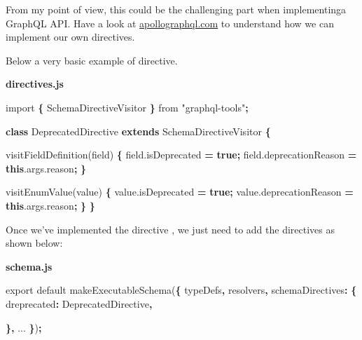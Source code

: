 \documentclass[]{book}
\newenvironment{Shaded}{\begin{snugshade}}{\end{snugshade}}
\newcommand{\KeywordTok}[1]{\textcolor[rgb]{0.13,0.29,0.53}{\textbf{#1}}}
\newcommand{\DataTypeTok}[1]{\textcolor[rgb]{0.13,0.29,0.53}{#1}}
\newcommand{\StringTok}[1]{\textcolor[rgb]{0.31,0.60,0.02}{#1}}
\newcommand{\ImportTok}[1]{#1}
\newcommand{\VariableTok}[1]{\textcolor[rgb]{0.00,0.00,0.00}{#1}}
\newcommand{\OperatorTok}[1]{\textcolor[rgb]{0.81,0.36,0.00}{\textbf{#1}}}
\newcommand{\AttributeTok}[1]{\textcolor[rgb]{0.77,0.63,0.00}{#1}}
\newcommand{\NormalTok}[1]{#1}
\begin{document}
From my point of view, this could be the challenging part when
implementinga GraphQL API. Have a look at
\href{https://www.apollographql.com/docs/graphql-tools/schema-directives.html}{apollographql.com}
to understand how we can implement our own directives.

Below a very basic example of directive.

\textbf{directives.js}

\begin{Shaded}
\begin{Highlighting}[]
\ImportTok{import} \OperatorTok{\{}\NormalTok{ SchemaDirectiveVisitor }\OperatorTok{\}} \ImportTok{from} \StringTok{"graphql-tools"}\OperatorTok{;}

\KeywordTok{class}\NormalTok{ DeprecatedDirective }\KeywordTok{extends}\NormalTok{ SchemaDirectiveVisitor }\OperatorTok{\{}
  
  \AttributeTok{visitFieldDefinition}\NormalTok{(field) }\OperatorTok{\{}
    \VariableTok{field}\NormalTok{.}\AttributeTok{isDeprecated} \OperatorTok{=} \KeywordTok{true}\OperatorTok{;}
    \VariableTok{field}\NormalTok{.}\AttributeTok{deprecationReason} \OperatorTok{=} \KeywordTok{this}\NormalTok{.}\VariableTok{args}\NormalTok{.}\AttributeTok{reason}\OperatorTok{;}
  \OperatorTok{\}}

  \AttributeTok{visitEnumValue}\NormalTok{(value) }\OperatorTok{\{}
    \VariableTok{value}\NormalTok{.}\AttributeTok{isDeprecated} \OperatorTok{=} \KeywordTok{true}\OperatorTok{;}
    \VariableTok{value}\NormalTok{.}\AttributeTok{deprecationReason} \OperatorTok{=} \KeywordTok{this}\NormalTok{.}\VariableTok{args}\NormalTok{.}\AttributeTok{reason}\OperatorTok{;}
  \OperatorTok{\}}
\OperatorTok{\}}
\end{Highlighting}
\end{Shaded}

Once we've implemented the directive , we just need to add the
directives as shown below:

\textbf{schema.js}

\begin{Shaded}
\begin{Highlighting}[]
\ImportTok{export} \ImportTok{default} \AttributeTok{makeExecutableSchema}\NormalTok{(}\OperatorTok{\{}
\NormalTok{    typeDefs}\OperatorTok{,}
\NormalTok{    resolvers}\OperatorTok{,}
    \DataTypeTok{schemaDirectives}\OperatorTok{:} \OperatorTok{\{}
        \DataTypeTok{dreprecated}\OperatorTok{:}\NormalTok{ DeprecatedDirective}\OperatorTok{,}
        
    \OperatorTok{\},}
\NormalTok{    ...}
\OperatorTok{\}}\NormalTok{)}\OperatorTok{;}
\end{Highlighting}
\end{Shaded}
\end{document}
